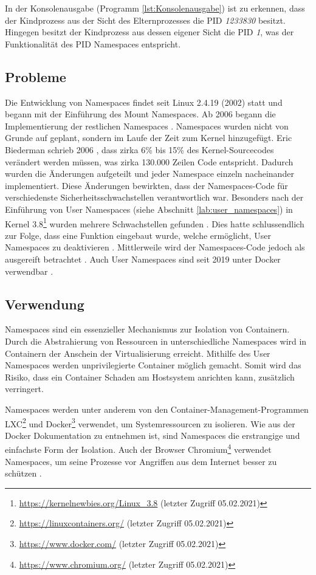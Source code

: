 In der Konsolenausgabe (Programm \ref{lst:Konsolenausgabe}) ist zu erkennen,
dass der Kindprozess aus der Sicht des Elternprozesses die PID \emph{1233830}
besitzt. Hingegen besitzt der Kindprozess aus dessen eigener Sicht die PID
\emph{1}, was der Funktionalität des PID Namespaces entspricht.

\subsection{Probleme}
Die Entwicklung von Namespaces findet seit Linux 2.4.19 (2002) statt und begann
mit der Einführung des Mount Namespaces. Ab 2006 begann die Implementierung der
restlichen Namespaces \cite{GlobalLinuxNamespaces}. Namespaces wurden nicht von
Grunde auf geplant, sondern im Laufe der Zeit zum Kernel hinzugefügt. Eric
Biederman schrieb 2006 \cite{GlobalLinuxNamespaces}, dass zirka 6\% bis 15\%
des Kernel-Sourcecodes
verändert werden müssen, was zirka 130.000 Zeilen Code entspricht.
Dadurch wurden die Änderungen aufgeteilt und
jeder Namespace einzeln nacheinander implementiert. Diese Änderungen bewirkten,
dass der Namespaces-Code für verschiedenste Sicherheitsschwachstellen
verantwortlich war. Besonders nach der Einführung von User Namespaces (siehe
Abschnitt {\ref{lab:user_namespaces}}) in Kernel
3.8\footnote{\url{https://kernelnewbies.org/Linux_3.8} (letzter Zugriff
05.02.2021)} wurden mehrere Schwachstellen gefunden
\cite[26]{HardeningContainers}. Dies hatte schlussendlich zur Folge, dass eine
Funktion eingebaut wurde, welche ermöglicht, User Namespaces zu deaktivieren
\cite{patch_disable_user_namespaces}. Mittlerweile wird der Namespaces-Code
jedoch als ausgereift betrachtet \cite{docker_engine_security_ausgereift}. Auch
User Namespaces sind seit 2019 unter Docker verwendbar \cite{docker_rootless}.

\subsection{Verwendung} 
Namespaces sind ein essenzieller Mechanismus zur Isolation von Containern. Durch die
Abstrahierung von Ressourcen in unterschiedliche Namespaces wird in Containern
der Anschein der Virtualisierung erreicht. Mithilfe des User Namespaces werden
unprivilegierte Container möglich gemacht. Somit wird das Risiko, dass ein
Container Schaden am Hostsystem anrichten kann, zusätzlich verringert. 

Namespaces werden unter anderem von den Container-Management-Programmen
LXC\footnote{\url{https://linuxcontainers.org/} (letzter Zugriff 05.02.2021)}
und Docker\footnote{\url{https://www.docker.com/} (letzter Zugriff 05.02.2021)}
verwendet, um Systemressourcen zu isolieren. Wie aus der Docker Dokumentation
\cite{docker_engine_security_ausgereift} zu entnehmen ist, sind Namespaces die
erstrangige und einfachste Form der Isolation. Auch der Browser
Chromium\footnote{\url{https://www.chromium.org/} (letzter Zugriff 05.02.2021)}
verwendet Namespaces, um seine Prozesse vor Angriffen aus dem Internet besser
zu schützen \cite{chrome_linux_sandboxing}.

